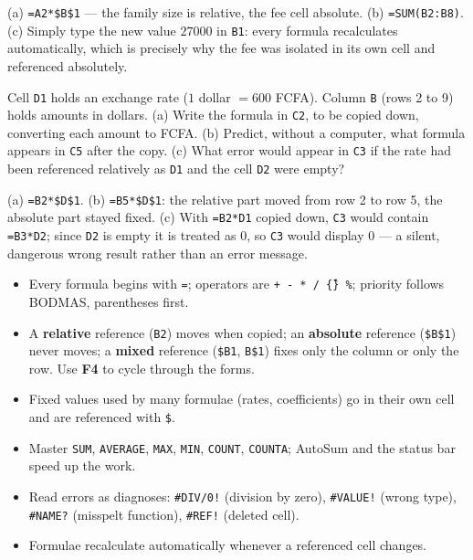 \documentclass[11pt]{article}
\begin{document}
\begin{corrige}[Exercise 1]
(a) \texttt{=A2*\$B\$1} --- the family size is relative, the fee cell absolute. (b) \texttt{=SUM(B2:B8)}. (c) Simply type the new value $27000$ in \texttt{B1}: every formula recalculates automatically, which is precisely why the fee was isolated in its own cell and referenced absolutely.
\end{corrige}

\begin{exercice}
Cell \texttt{D1} holds an exchange rate ($1$ dollar $= 600$ FCFA). Column \texttt{B} (rows 2 to 9) holds amounts in dollars. (a) Write the formula in \texttt{C2}, to be copied down, converting each amount to FCFA. (b) Predict, without a computer, what formula appears in \texttt{C5} after the copy. (c) What error would appear in \texttt{C3} if the rate had been referenced relatively as \texttt{D1} and the cell \texttt{D2} were empty?
\end{exercice}

\begin{corrige}[Exercise 2]
(a) \texttt{=B2*\$D\$1}. (b) \texttt{=B5*\$D\$1}: the relative part moved from row 2 to row 5, the absolute part stayed fixed. (c) With \texttt{=B2*D1} copied down, \texttt{C3} would contain \texttt{=B3*D2}; since \texttt{D2} is empty it is treated as $0$, so \texttt{C3} would display $0$ --- a silent, dangerous wrong result rather than an error message.
\end{corrige}

\begin{aretenir}
\begin{itemize}
\item Every formula begins with \texttt{=}; operators are \texttt{+ - * / \^\{\} \%}; priority follows BODMAS, parentheses first.
\item A \textbf{relative} reference (\texttt{B2}) moves when copied; an \textbf{absolute} reference (\texttt{\$B\$1}) never moves; a \textbf{mixed} reference (\texttt{\$B1}, \texttt{B\$1}) fixes only the column or only the row. Use \textbf{F4} to cycle through the forms.
\item Fixed values used by many formulae (rates, coefficients) go in their own cell and are referenced with \texttt{\$}.
\item Master \texttt{SUM}, \texttt{AVERAGE}, \texttt{MAX}, \texttt{MIN}, \texttt{COUNT}, \texttt{COUNTA}; AutoSum and the status bar speed up the work.
\item Read errors as diagnoses: \texttt{\#DIV/0!} (division by zero), \texttt{\#VALUE!} (wrong type), \texttt{\#NAME?} (misspelt function), \texttt{\#REF!} (deleted cell).
\item Formulae recalculate automatically whenever a referenced cell changes.
\end{itemize}
\end{aretenir}
\end{document}

